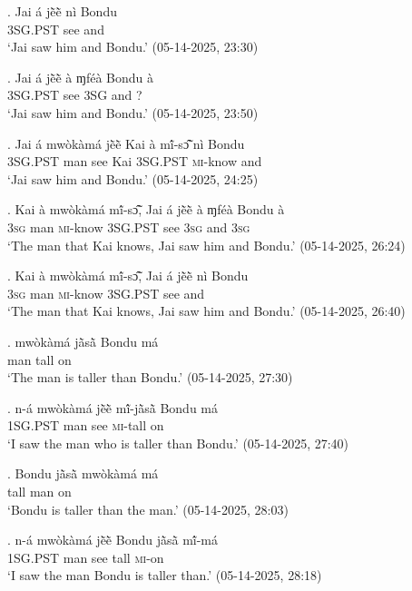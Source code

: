 \documentclass{assets/fieldnotes}
\begin{document}
\exg. Jai á jẽ̀ẽ̀ nì Bondu\\
{} \textsc{3SG.PST} see and {}\\
`Jai saw him and Bondu.’ \hfill{(05-14-2025, 23:30)}

\exg. Jai á jẽ̀ẽ̀ à ɱféà Bondu à \\
{} \textsc{3SG.PST} see \textsc{3SG} and {} \textsc{?}\\
`Jai saw him and Bondu.’ \hfill{(05-14-2025, 23:50)}

\exg. Jai á mwòkàmá jẽ̀ẽ̀ Kai à mĩ́-sɔ̃̂ nì Bondu \\
{} \textsc{3SG.PST} man see Kai \textsc{3SG.PST} \textsc{mi}-know and {}\\
`Jai saw him and Bondu.’ \hfill{(05-14-2025, 24:25)}

\exg. Kai à mwòkàmá mĩ́-sɔ̃̂, Jai á jẽ̀ẽ̀ à ɱféà Bondu à\\
{} \textsc{3sg} man \textsc{mi}-know {} \textsc{3SG.PST} see \textsc{3sg} and {} \textsc{3sg}\\
`The man that Kai knows, Jai saw him and Bondu.’ \hfill{(05-14-2025, 26:24)}

\exg. Kai à mwòkàmá mĩ́-sɔ̃̂, Jai á jẽ̀ẽ̀ nì Bondu\\
{} \textsc{3sg} man \textsc{mi}-know {} \textsc{3SG.PST} see and {}\\
`The man that Kai knows, Jai saw him and Bondu.’ \hfill{(05-14-2025, 26:40)}

\exg. mwòkàmá jã̀sã̀ Bondu má\\
man tall {} on\\
`The man is taller than Bondu.’ \hfill{(05-14-2025, 27:30)}

\exg. n-á mwòkàmá jẽ̀ẽ̀ mĩ́-jã̀sã̀ Bondu má\\
\textsc{1SG.PST} man see \textsc{mi}-tall {} on\\
`I saw the man who is taller than Bondu.’ \hfill{(05-14-2025, 27:40)}

\exg. Bondu jã̀sã̀ mwòkàmá má\\
{} tall man on\\
`Bondu is taller than the man.’ \hfill{(05-14-2025, 28:03)}

\exg. n-á mwòkàmá jẽ̀ẽ̀ Bondu jã̀sã̀ mĩ́-má\\
\textsc{1SG.PST} man see {} tall \textsc{mi}-on\\
`I saw the man Bondu is taller than.’ \hfill{(05-14-2025, 28:18)}
\end{document}
